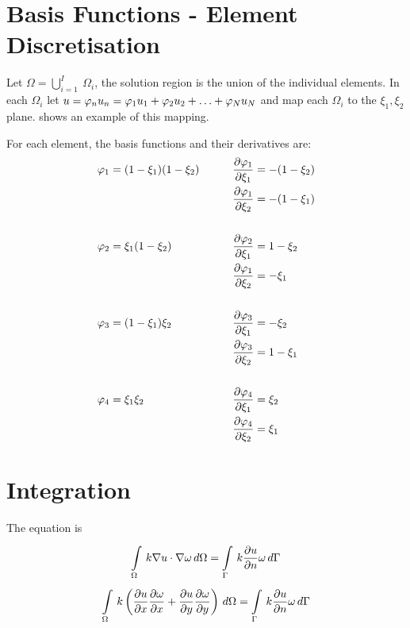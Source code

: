 
\section{Basis Functions - Element Discretisation}

Let $\Omega = \displaystyle{\bigcup^{I}_{i=1}} \medspace \Omega_{i}$, \ie the
solution region is the union of the individual elements. In each $\Omega_{i}$ let $u =
 \varphi_{n} u_{n} =  \varphi_{1} u_{1} +  \varphi_{2} u_{2} + \ldots + 
 \varphi_{N} u_{N}$ and map each $\Omega_{i}$ to the $\xi_{1}, \xi_{2}$
plane.  shows an example of this mapping. 

For each element, the basis functions and their derivatives are:
\begin{alignat}{2}
   \varphi_{1}  &= (1-\xi_{1})(1-\xi_{2})  
  &\qquad  \dfrac{\partial  \varphi_{1} }{\partial \xi_{1}} &=-(1-\xi_{2})\\ 
  && \dfrac{\partial  \varphi_{1} }{\partial \xi_{2}} 
  &=-(1-\xi_{1})\\\\
   \varphi_{2} &=\xi_{1}(1-\xi_{2}) &\quad  \dfrac{\partial  \varphi_{2} }{\partial \xi_{1}} &=1-\xi_{2}\\ 
  && \dfrac{\partial  \varphi_{1} }{\partial \xi_{2}} &=-\xi_{1} \\\\ 
   \varphi_{3} &=(1-\xi_{1})\xi_{2} &\quad  \dfrac{\partial  \varphi_{3} }{\partial \xi_{1}} &=-\xi_{2}\\ 
  && \dfrac{\partial  \varphi_{3} }{\partial \xi_{2}} &=1-\xi_{1} \\\\  
   \varphi_{4} &=\xi_{1}\xi_{2} &\quad  \dfrac{\partial  \varphi_{4} }{\partial \xi_{1}} &=\xi_{2}\\ 
  && \dfrac{\partial  \varphi_{4} }{\partial \xi_{2}} &=\xi_{1} 
\end{alignat}

\section{Integration}

The equation is 
\begin{equation}
     \displaystyle\int\limits_{\Omega}^{} \,k\nabla u\cdot\nabla \omega\,d\Omega   
     =    \displaystyle\int\limits_{\Gamma}^{} \,k \dfrac{\partial u}{\partial n} \omega\,d\Gamma  
\end{equation}
\ie
\begin{equation}
     \displaystyle\int\limits_{\Omega}^{} \,k\left(  \dfrac{\partial u}{\partial x}  \dfrac{\partial \omega}{\partial x}  + 
     \dfrac{\partial u}{\partial y}  \dfrac{\partial \omega}{\partial y}  \right)\,d\Omega   =    \displaystyle\int\limits_{\Gamma}^{} \,k \dfrac{\partial u}{\partial n} \omega\,d\Gamma  
\end{equation}

